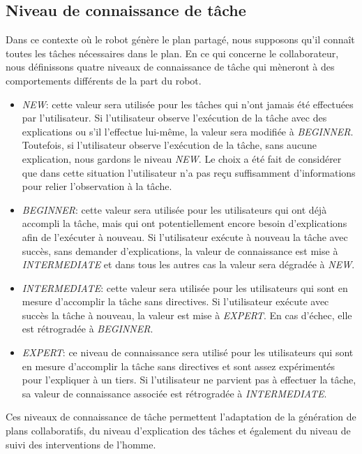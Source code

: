 \documentclass[a4paper,11pt,twoside]{StyleThese}
\begin{document}
\subsection{Niveau de connaissance de tâche}

Dans ce contexte où le robot génère le plan partagé, nous supposons qu'il connaît toutes les tâches nécessaires dans le plan.
En ce qui concerne le collaborateur, nous définissons quatre niveaux de connaissance de tâche qui mèneront à des comportements différents de la part du robot.

\begin{itemize}
\item \textit{NEW}: cette valeur sera utilisée pour les tâches qui n'ont jamais été effectuées par l'utilisateur. Si l'utilisateur observe l'exécution de la tâche avec des explications ou s'il l'effectue lui-même, la valeur sera modifiée à \textit{BEGINNER}.
Toutefois, si l'utilisateur observe l'exécution de la tâche, sans aucune explication, nous gardons le niveau \textit{NEW}. Le choix a été fait de considérer que dans cette situation l'utilisateur n'a pas reçu suffisamment d'informations pour relier l'observation à la tâche.
\item \textit{BEGINNER}: cette valeur sera utilisée pour les utilisateurs qui ont déjà accompli la tâche, mais qui ont potentiellement encore besoin d'explications afin de l'exécuter à nouveau. Si l'utilisateur exécute à nouveau la tâche avec succès, sans demander d'explications, la valeur de connaissance est mise à \textit{INTERMEDIATE} et dans tous les autres cas la valeur sera dégradée à \textit{NEW}.
\item \textit{INTERMEDIATE}: cette valeur sera utilisée pour les utilisateurs qui sont en mesure d'accomplir la tâche sans directives. Si l'utilisateur exécute avec succès la tâche à nouveau, la valeur est mise à \textit{EXPERT}. En cas d'échec, elle est rétrogradée à \textit{BEGINNER}.
\item \textit{EXPERT}: ce niveau de connaissance sera utilisé pour les utilisateurs qui sont en mesure d'accomplir la tâche sans directives et sont assez expérimentés pour l'expliquer à un tiers. Si l'utilisateur ne parvient pas à effectuer la tâche, sa valeur de connaissance associée est rétrogradée à \textit{INTERMEDIATE}.
\end{itemize}

Ces niveaux de connaissance de tâche permettent l'adaptation de la génération de plans collaboratifs, du niveau d'explication des tâches et également du niveau de suivi des interventions de l'homme.
\end{document}
